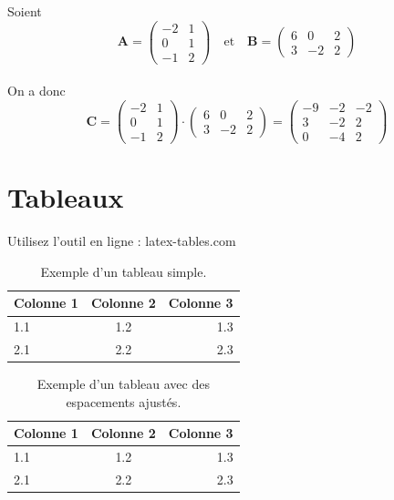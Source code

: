 \bigskip
\noindent Soient \\
\begin{displaymath}
	\mathbf{A}=
	\begin{pmatrix}
		-2 & 1 \\
		0 & 1 \\
		-1 & 2
	\end{pmatrix} \quad \text{et} \quad
	\mathbf{B}=
	\begin{pmatrix}
		6 & 0 & 2\\
		3 & -2 & 2
	\end{pmatrix}
\end{displaymath}\\
On a donc
\begin{displaymath}
	\mathbf{C}=
	\begin{pmatrix}
		-2 & 1 \\
		0 & 1 \\
		-1 & 2
	\end{pmatrix} \cdot
	\begin{pmatrix}
		6 & 0 & 2\\
		3 & -2 & 2
	\end{pmatrix}=
	\begin{pmatrix}
		-9 & -2 & -2 \\
		3 & -2 & 2 \\
		0 & -4 & 2
	\end{pmatrix}
\end{displaymath}

\section{Tableaux}
Utilisez l'outil en ligne : latex-tables.com 

\begin{table}[h]
	\caption{Exemple d'un tableau simple.}
	\centering
	\begin{tabular}{|l|c|r|}
		\hline
		Colonne 1 & Colonne 2 & Colonne 3 \\ \hline
		1.1 & 1.2 & 1.3 \\ \hline
		2.1 & 2.2 & 2.3 \\
		\hline
	\end{tabular}
\end{table}

\begin{table}[h]
	\setlength{\arrayrulewidth}{0.5mm}
	\setlength{\tabcolsep}{18pt}
	\renewcommand{\arraystretch}{1.5}
	\caption{Exemple d'un tableau avec des espacements ajustés.}
	\centering
	\begin{tabular}{|l|c|r|}
		\hline
		Colonne 1 & Colonne 2 & Colonne 3 \\ \hline
		1.1 & 1.2 & 1.3 \\ \hline
		2.1 & 2.2 & 2.3 \\ \hline
	\end{tabular}
\end{table}


